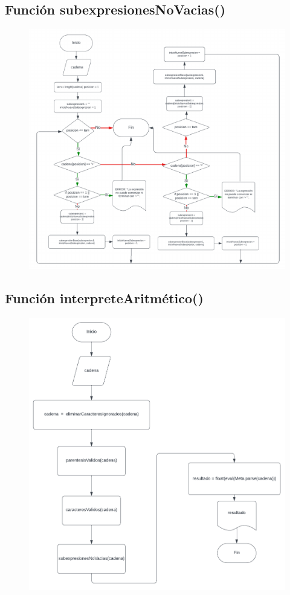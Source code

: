 \documentclass{article}
\begin{document}
\pagebreak
\subsection{Función subexpresionesNoVacias()}
\begin{figure}[h] 
	\centering 	\includegraphics[width=1.255\linewidth]{Función subexpresionesNoVacias.png}
	\label{fig:Gráfica 3}
\end{figure}

\pagebreak
\subsection{Función interpreteAritmético()}
\begin{figure}[h] 
	\centering 	\includegraphics[width=1.1\linewidth]{Función interpreteAritmetico.png}
	\label{fig:Gráfica 3}
\end{figure}
\end{document}
